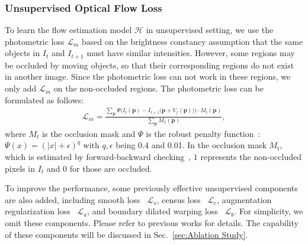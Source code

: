 \documentclass[final]{cvpr}
\begin{document}
\subsubsection{Unsupervised Optical Flow Loss}\label{sec:algo_unsupervised_photometric_loss}
To learn the flow estimation model $\mathcal{H}$ in unsupervised setting, we use the photometric loss $\mathcal{L}_m$ based on the brightness constancy assumption that the same objects in $I_t$ and $I_{t+1}$ must have similar intensities. However, some regions may be occluded by moving objects, so that their corresponding regions do not exist in another image. 
Since the photometric loss can not work in these regions, we only add $\mathcal{L}_m$ on the non-occluded regions. The photometric loss can be formulated as follows:
\begin{align}
\mathcal{L}_m=\frac{\sum_{\bm{p}}{\Psi\Big(I_t(\bm{p})-I_{t+1}\big(\bm{p}+V_{f}(\bm{p})\big)\Big) \cdot M_{t}(\bm{p})}}{\sum_{\bm{p}}{M_{1}(\bm{p})}}, \label{eq:photometric_loss_occ} 
\end{align}
where $M_{t}$ is the occlusion mask and $\Psi$ is the robust penalty function~\cite{Pengpeng2019}: $\Psi(x)=(|x|+\epsilon)^q$ with $q, \epsilon$ being 0.4 and 0.01. In the occlusion mask $M_{t}$, which is estimated by forward-backward checking~\cite{unflow_2018aaai}, $1$ represents the non-occluded pixels in $I_t$ and $0$ for those are occluded. 


To improve the performance, some previously effective unsupervised components are also added, including smooth loss~\cite{wang2018} $\mathcal{L}_{s}$, 
census loss~\cite{unflow_2018aaai} $\mathcal{L}_{c}$,
augmentation regularization loss~\cite{liu2020learning} $\mathcal{L}_{a}$, and boundary dilated warping loss~\cite{luo2020occinpflow} $\mathcal{L}_{b}$. 
For simplicity, we omit these components. Please refer to previous works for details. 
The capability of these components will be discussed in Sec.~\ref{sec:Ablation Study}. 
\end{document}
